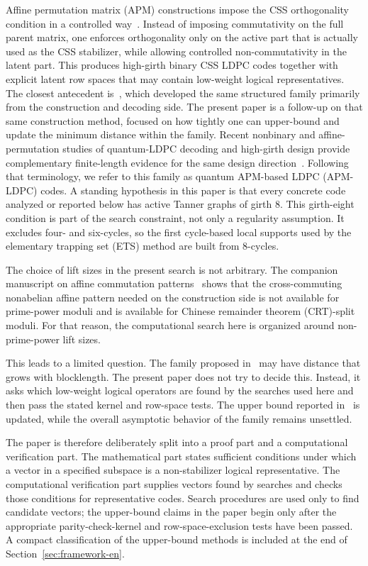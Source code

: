 \documentclass[11pt]{article}
\newcommand{\markededit}[1]{#1}
\theoremstyle{uprightthm}
\begin{document}
Affine permutation matrix (APM) constructions impose the CSS orthogonality
condition in a controlled way~\cite{MyungYangPark2006,KasaiEtAl2011,KomotoKasai2025,KasaiGirth16APM2025,Kasai2026}.
Instead of imposing commutativity on the full parent matrix, one enforces
orthogonality only on the active part that is actually used as the CSS
stabilizer, while allowing controlled non-commutativity in the latent part.
This produces high-girth binary CSS LDPC codes together with explicit latent
row spaces that may contain low-weight logical representatives.  The closest antecedent is~\cite{Kasai2026}, which developed the
same structured family primarily from the construction and decoding side. The
present paper is a follow-up on that same construction method, focused on how
tightly one can upper-bound and update the minimum distance within the family.
Recent nonbinary and affine-permutation studies of quantum-LDPC decoding and
high-girth design provide complementary finite-length evidence for the same
design direction~\cite{KasaiISIT2025,KasaiDegeneracy2025,KomotoKasaiSharpBP2025,KasaiGirth16APM2025}.
Following that terminology, we refer to this family as quantum APM-based LDPC
(APM-LDPC) codes.
A standing hypothesis in this paper is that every concrete code analyzed or
reported below has active Tanner graphs of girth 8. This girth-eight condition
is part of the search constraint, not only a regularity assumption.  It
excludes four- and six-cycles, so the first cycle-based local
supports used by the elementary trapping set (ETS) method are built from
8-cycles.

The choice of lift sizes in the present search is not arbitrary. The companion
manuscript on affine commutation patterns~\cite{KasaiCommPattern2026} shows
that the cross-commuting nonabelian affine pattern needed on the construction
side is not available for prime-power moduli and is available for
Chinese remainder theorem (CRT)-split moduli. For that reason, the
computational search here is organized around non-prime-power lift sizes.

This leads to a limited question. The family proposed
in~\cite{Kasai2026} may have distance that grows with blocklength.  The present
paper does not try to decide this.  Instead, it asks which low-weight logical
operators are found by the searches used here and then \markededit{pass} the stated
kernel and row-space tests.  The upper bound reported in~\cite{Kasai2026} is updated, while the
overall asymptotic behavior of the family remains unsettled.

The paper is therefore deliberately split into a proof part and a
computational verification part.  The mathematical part states sufficient conditions under which
a vector in a specified subspace is a non-stabilizer logical representative.
The computational verification part supplies vectors found by searches and checks
those conditions for representative codes.  Search procedures are used only to
find candidate vectors; the upper-bound claims in the paper begin only after the
appropriate parity-check-kernel and row-space-exclusion tests have been \markededit{passed}.
A compact classification of the upper-bound methods is included at the end of
Section~\ref{sec:framework-en}.
\end{document}
